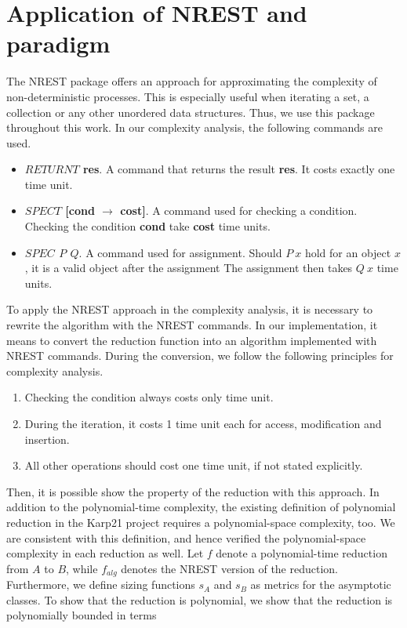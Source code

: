 \section{Application of NREST and paradigm}
The NREST package offers an approach for approximating the complexity of non-deterministic processes.
This is especially useful when iterating a set, a collection or any other unordered data structures. Thus,
we use this package throughout this work. In our complexity analysis, the following commands are used. 
\begin{itemize}
    \item \textbf{$RETURNT$ res}. A command that returns the result \textbf{res}. It costs exactly one time unit.
    \item \textbf{$SPECT$ [cond $\rightarrow$ cost]}. A command used for checking a condition. Checking the condition \textbf{cond}
    take \textbf{cost} time units.
    \item \textbf{$SPEC$ $P$ $Q$}. A command used for assignment. Should $P\ x$ hold for an object $x$, it is a valid object after the assignment
    The assignment then takes $Q\ x$ time units.
\end{itemize}
To apply the NREST approach in the complexity analysis, it is necessary to rewrite the algorithm with the NREST commands.
In our implementation, it means to convert the reduction function into an algorithm implemented with NREST commands.
During the conversion, we follow the following principles for complexity analysis.
\begin{enumerate}
    \item Checking the condition always costs only time unit. 
    \item During the iteration, it costs 1 time unit each for access, modification and insertion.
    \item All other operations should cost one time unit, if not stated explicitly.
\end{enumerate}
Then, it is possible show the property of the reduction with this approach. In addition to the polynomial-time complexity, 
the existing definition of polynomial reduction in the Karp21 project requires a polynomial-space complexity, too. 
We are consistent with this definition, and hence verified the polynomial-space complexity in each reduction as well.
Let $f$ denote a polynomial-time reduction from $A$ to $B$, while $f_{alg}$ denotes the NREST version of the reduction.
Furthermore, we define sizing functions $s_A$ and $s_B$ as metrics for the asymptotic classes.
To show that the reduction is polynomial, we show that the reduction is polynomially bounded in terms 
